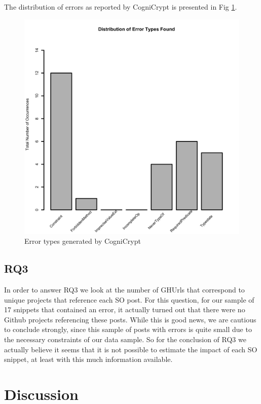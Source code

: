 \documentclass[10pt, conference]{IEEEtran}
\begin{document}
The distribution of errors as reported by CogniCrypt is presented in Fig \ref{fig:errorDistribution}.

\begin{figure}[h]
\begin{center}
\includegraphics[width=0.9\linewidth]{Dist.png}
\caption{Error types generated by CogniCrypt}
\label{fig:errorDistribution}
\end{center}
\end{figure}

\subsection{RQ3}

In order to answer RQ3 we look at the number of GHUrls that correspond to unique projects that reference each SO post. 
For this question, for our sample of 17 snippets that contained an error, it actually turned out that there were no Github projects referencing these posts. While this is good news, we are cautious to conclude strongly, since this sample of posts with errors is quite small due to the necessary constraints of our data sample.
So for the conclusion of RQ3 we actually believe it seems that it is not possible to estimate the impact of each SO snippet, at least with this much information available.


\section{Discussion}
\end{document}
